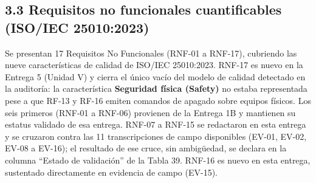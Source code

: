 \subsection*{3.3 Requisitos no funcionales cuantificables (ISO/IEC 25010:2023)}


Se presentan 17 Requisitos No Funcionales (RNF-01 a RNF-17), cubriendo las nueve características de calidad de ISO/IEC 25010:2023. RNF-17 es nuevo en la Entrega 5 (Unidad V) y cierra el único vacío del modelo de calidad detectado en la auditoría: la característica \textbf{Seguridad física (Safety)} no estaba representada pese a que RF-13 y RF-16 emiten comandos de apagado sobre equipos físicos. Los seis primeros (RNF-01 a RNF-06) provienen de la Entrega 1B y mantienen su estatus validado de esa entrega. RNF-07 a RNF-15 se redactaron en esta entrega y se cruzaron contra las 11 transcripciones de campo disponibles (EV-01, EV-02, EV-08 a EV-16); el resultado de ese cruce, sin ambigüedad, se declara en la columna ``Estado de validación'' de la Tabla 39. RNF-16 es nuevo en esta entrega, sustentado directamente en evidencia de campo (EV-15).


